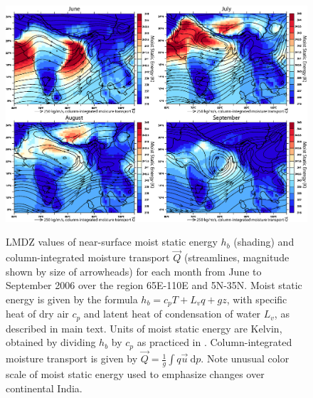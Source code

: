 \begin{figure}[t]
\centering
  \noindent\includegraphics[width=36pc,angle=0]{Figures/ch2/fig11lmdz}\\
  \caption{LMDZ values of near-surface moist static energy $h_b$ (shading) and column-integrated moisture transport $\vec{Q}$ (streamlines, magnitude shown by size of arrowheads) for each month from June to September 2006 over the region 65\textdegree E-110\textdegree E and 5\textdegree N-35\textdegree N. Moist static energy is given by the formula $h_b=c_pT+L_vq+gz$, with specific heat of dry air $c_p$ and latent heat of condensation of water $L_v$, as described in main text. Units of moist static energy are Kelvin, obtained by dividing $h_b$ by $c_p$ as practiced in \cite{Boos2013a}. Column-integrated moisture transport is given by $\vec{Q}=\frac{1}{g}\int q\vec{u}\ \mathrm{d}p $. Note unusual color scale of moist static energy used to emphasize changes over continental India.}
  \label{fig:f211}
\end{figure}
